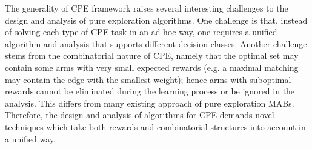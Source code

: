 \documentclass{article}
\newcommand{\junk}[1]{}
\newcommand{\Problem}{{CPE}\xspace}
\begin{document}
The generality of \Problem framework raises several interesting challenges to the design and analysis of pure exploration algorithms. 
One challenge is that, instead of solving each type of \Problem task in an ad-hoc way, one requires a unified algorithm and analysis that supports different decision classes.
Another challenge stems from the combinatorial nature of \Problem, namely that the optimal set may contain some arms with very small expected rewards (e.g. a maximal matching may contain the edge with the smallest weight); hence arms with suboptimal rewards cannot be eliminated  during the learning process or be ignored in the analysis. This differs from many existing approach of pure exploration MABs.
Therefore, the design and analysis of algorithms for \Problem demands novel techniques which take both rewards and combinatorial structures into account in a unified way.
\junk{
Before describing our results, we recall two common settings in pure exploration problems: fixed confidence and fixed budget. 
In the fixed confidence setting, the learner need to guarantee that she correctly identifies the optimal set with high probability while uses a small number of rounds(samples).  
In the fixed budget setting, the learner uses at most a fixed number of samples and she need to minimize her probability of error (identifies a suboptimal set).
}
\end{document}
